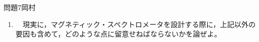 \documentclass[fleqn]{jbook}
\begin{document}
\begin{question}{問題7}{岡村}
\begin{enumerate}
    \begin{enumerate}
    
    \item 　サジッタ$S$を$L$と$R$の関数で表せ。$L\ll R$であることを考慮して近似を用いる%
    こと。さらに，$(1)$式を用いてサジッタ$S$を$L$と$p$の関数で表せ。
    
    \item 　サジッタに誤差$\delta S$があると考え，$\delta p$を$L,B,p,\delta S$の関数で表せ。
    
    \item 　この誤差の原因は測定器による誤差である。測定器１，２および３は，等しい$z$座標を持つ%
    面上において$x$方向のみ測定するとし，各測定器の位置分解能（$x$方向）は同じ値$\sigma$を持つと仮定して，サジッタ$S$の誤差$\delta S$を$\sigma$の関数で表せ。
    
    \item 　以上により，$\delta p/p$を$L,B,p,\sigma$の関数で表せ。\\
    
\end{enumerate}

  \item 　現実に，マグネティック・スペクトロメータを設計する際に，上記以外の要因も含めて，どのような点に留意せねばならないかを論ぜよ。\\
  
\end{enumerate}

\end{question}

\end{document}
